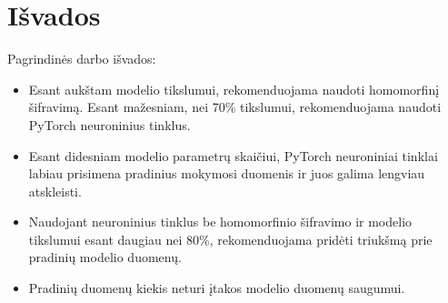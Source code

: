 \documentclass{VUMIFInfBakalaurinis}
\begin{document}
\section{Išvados}

\par Pagrindinės darbo išvados:
\begin{itemize}
    \item  Esant aukštam modelio tikslumui, rekomenduojama naudoti homomorfinį šifravimą. Esant mažesniam, nei 70\% tikslumui, rekomenduojama naudoti PyTorch neuroninius tinklus.
    \item Esant didesniam modelio parametrų skaičiui, PyTorch neuroniniai tinklai labiau prisimena pradinius mokymosi duomenis ir juos galima lengviau atskleisti.
    \item Naudojant neuroninius tinklus be homomorfinio šifravimo ir modelio tikslumui esant daugiau nei 80\%, rekomenduojama pridėti triukšmą prie pradinių modelio duomenų.
    \item Pradinių duomenų kiekis neturi įtakos modelio duomenų saugumui.
\end{itemize}
\end{document}
